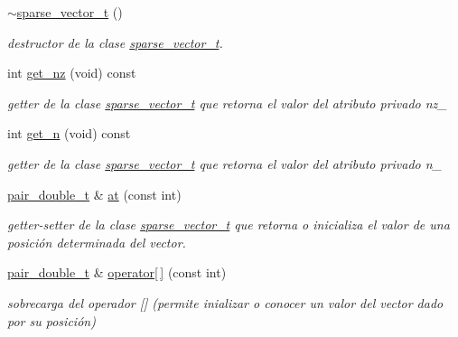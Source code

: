 \begin{DoxyCompactItemize}
\mbox{\label{classsparse__vector__t_aef77250d3913eac1f2852ad66222deb6}} 
\hyperlink{classsparse__vector__t_aef77250d3913eac1f2852ad66222deb6}{$\sim$sparse\+\_\+vector\+\_\+t} ()
\begin{DoxyCompactList}\small\item\em destructor de la clase \hyperlink{classsparse__vector__t}{sparse\+\_\+vector\+\_\+t}. \end{DoxyCompactList}\item 
\mbox{\label{classsparse__vector__t_a31677204e3f0e2002d162ceb21e4522a}} 
int \hyperlink{classsparse__vector__t_a31677204e3f0e2002d162ceb21e4522a}{get\+\_\+nz} (void) const
\begin{DoxyCompactList}\small\item\em getter de la clase \hyperlink{classsparse__vector__t}{sparse\+\_\+vector\+\_\+t} que retorna el valor del atributo privado nz\+\_\+ \end{DoxyCompactList}\item 
\mbox{\label{classsparse__vector__t_ae4e2610cc211f86639c758c2f0a03ae5}} 
int \hyperlink{classsparse__vector__t_ae4e2610cc211f86639c758c2f0a03ae5}{get\+\_\+n} (void) const
\begin{DoxyCompactList}\small\item\em getter de la clase \hyperlink{classsparse__vector__t}{sparse\+\_\+vector\+\_\+t} que retorna el valor del atributo privado n\+\_\+ \end{DoxyCompactList}\item 
\hyperlink{classpair__t}{pair\+\_\+double\+\_\+t} \& \hyperlink{classsparse__vector__t_a060ab319f62aa0a6dd711f9d87d990f3}{at} (const int)
\begin{DoxyCompactList}\small\item\em getter-\/setter de la clase \hyperlink{classsparse__vector__t}{sparse\+\_\+vector\+\_\+t} que retorna o inicializa el valor de una posición determinada del vector. \end{DoxyCompactList}\item 
\hyperlink{classpair__t}{pair\+\_\+double\+\_\+t} \& \hyperlink{classsparse__vector__t_a6ebb64d89a60aac881dcb62dfefaa398}{operator\mbox{[}$\,$\mbox{]}} (const int)
\begin{DoxyCompactList}\small\item\em sobrecarga del operador \mbox{[}\mbox{]} (permite inializar o conocer un valor del vector dado por su posición) \end{DoxyCompactList}\item 

\end{DoxyCompactItemize}

